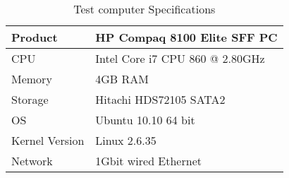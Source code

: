 \begin{table}[!h]
    \centering
    \caption{Test computer Specifications}
    \label{tab:hwbf}
    \begin{tabular}{| l | l |}
	\hline
	Product		        &HP Compaq 8100 Elite SFF PC \\
	\hline
	CPU		            &Intel Core i7 CPU 860 @ 2.80GHz\\
	\hline
	Memory	            &4GB \ac{RAM}\\
	\hline
    Storage             &Hitachi HDS72105 SATA2 \\
	\hline
    OS		            &Ubuntu 10.10 64 bit\\
	\hline
	Kernel Version	    &Linux 2.6.35\\
	\hline
    Network             &1Gbit wired Ethernet \\
    \hline
    \end{tabular}
\end{table}
